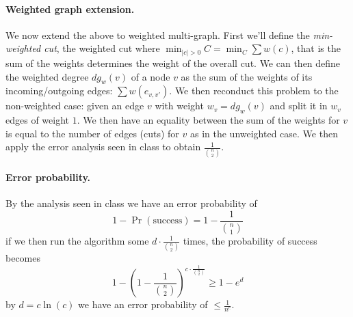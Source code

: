 \paragraph{Weighted graph extension.}
We now extend the above to weighted multi-graph.
First we'll define the \emph{min-weighted cut}, the weighted cut where
$\min_{|c| > 0} C = \min_{C} \sum{w(c)}$, that is the sum of the
weights determines the weight of the overall cut.
We can then define the weighted degree $dg_{w}(v)$ of a node $v$ as the
sum of the weights of its incoming/outgoing edges: $\sum{w(e_{v, v'})}$.
We then reconduct this problem to the non-weighted case: given an edge $v$ with weight $w_v = dg_{w}(v)$ and split it in $w_v$ edges of weight $1$.
We then have an equality between the sum of the weights for $v$ is equal to the number of edges (cuts) for $v$ as in the unweighted case.
We then apply the error analysis seen in class to obtain $\frac{1}{{{n} \choose {2}}}$.

\paragraph{Error probability.}
By the analysis seen in class we have an error probability of
\begin{equation*}
1 - \Pr({\text{success}}) = 1 - \frac{1}{{{n} \choose {1}}}
\end{equation*}
if we then run the algorithm some $d \cdot \frac{1}{{{n} \choose {2}}}$ times, the probability of success becomes
\begin{equation*}
1 - \left(1 - \frac{1}{{{n} \choose {2}}} \right)^{c \cdot \frac{1}{{{n} \choose {2}}}} \geq 1 - e^{d}
\end{equation*}
by $d = c \ln(c)$ we have an error probability of $\leq \frac{1}{n^c}$.